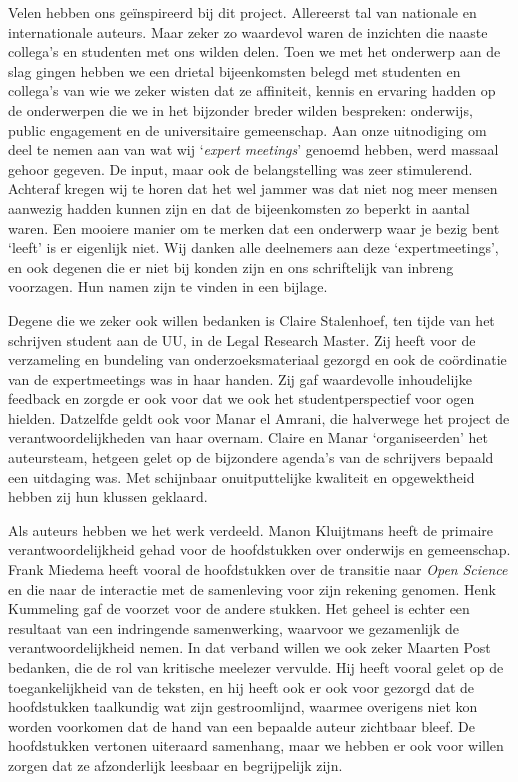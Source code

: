 \documentclass[smallauthor, chapterhaspagenum, nochapterinheader, pagenuminheader,  bigchapnum,medium2, tocpages, garamond, titleinheader]{jote-book}
\begin{document}
	Velen hebben ons geïnspireerd bij dit project. Allereerst tal van nationale en internationale auteurs. Maar zeker zo waardevol waren de inzichten die naaste collega's en studenten met ons wilden delen. Toen we met het onderwerp aan de slag gingen hebben we een drietal bijeenkomsten belegd met studenten en collega's van wie we zeker wisten dat ze affiniteit, kennis en ervaring hadden op de onderwerpen die we in het bijzonder breder wilden bespreken: onderwijs, public engagement en de universitaire gemeenschap. Aan onze uitnodiging om deel te nemen aan van wat wij ‘\emph{expert}\emph{ }\emph{meetings}' genoemd hebben, werd massaal gehoor gegeven. De input, maar ook de belangstelling was zeer stimulerend. Achteraf kregen wij te horen dat het wel jammer was dat niet nog meer mensen aanwezig hadden kunnen zijn en dat de bijeenkomsten zo beperkt in aantal waren. Een mooiere manier om te merken dat een onderwerp waar je bezig bent ‘leeft' is er eigenlijk niet. Wij danken alle deelnemers aan deze ‘expertmeetings', en ook degenen die er niet bij konden zijn en ons schriftelijk van inbreng voorzagen. Hun namen zijn te vinden in een bijlage.



	Degene die we zeker ook willen bedanken is Claire Stalenhoef, ten tijde van het schrijven student aan de UU, in de Legal Research Master. Zij heeft voor de verzameling en bundeling van onderzoeksmateriaal gezorgd en ook de coördinatie van de expertmeetings was in haar handen. Zij gaf waardevolle inhoudelijke feedback en zorgde er ook voor dat we ook het studentperspectief voor ogen hielden. Datzelfde geldt ook voor Manar el Amrani, die halverwege het project de verantwoordelijkheden van haar overnam. Claire en Manar ‘organiseerden' het auteursteam, hetgeen gelet op de bijzondere agenda's van de schrijvers bepaald een uitdaging was. Met schijnbaar onuitputtelijke kwaliteit en opgewektheid hebben zij hun klussen geklaard.



	Als auteurs hebben we het werk verdeeld. Manon Kluijtmans heeft de primaire verantwoordelijkheid gehad voor de hoofdstukken over onderwijs en gemeenschap. Frank Miedema heeft vooral de hoofdstukken over de transitie naar \emph{Open }\emph{Science} en die naar de interactie met de samenleving voor zijn rekening genomen. Henk Kummeling gaf de voorzet voor de andere stukken. Het geheel is echter een resultaat van een indringende samenwerking, waarvoor we gezamenlijk de verantwoordelijkheid nemen. In dat verband willen we ook zeker Maarten Post bedanken, die de rol van kritische meelezer vervulde. Hij heeft vooral gelet op de toegankelijkheid van de teksten, en hij heeft ook er ook voor gezorgd dat de hoofdstukken taalkundig wat zijn gestroomlijnd, waarmee overigens niet kon worden voorkomen dat de hand van een bepaalde auteur zichtbaar bleef. De hoofdstukken vertonen uiteraard samenhang, maar we hebben er ook voor willen zorgen dat ze afzonderlijk leesbaar en begrijpelijk zijn.
\end{document}
